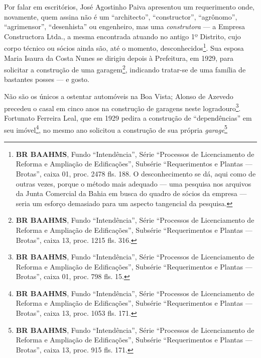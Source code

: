Por falar em escritórios, José Agostinho Paiva apresentou um requerimento onde, novamente, quem assina não é um ``architecto'', ``constructor'', ``agrônomo'', ``agrimensor'', ``desenhista'' ou engenheiro, mas uma \textit{construtora} --- a Empresa Constructora Ltda., a mesma encontrada atuando no antigo 1º Distrito, cujo corpo técnico ou sócios ainda são, até o momento, desconhecidos\footnote{\textbf{BR BAAHMS}, Fundo ``Intendência'', Série ``Processos de Licenciamento de Reforma e Ampliação de Edificações'', Subsérie ``Requerimentos e Plantas --- Brotas'', caixa 01, proc. 2478 fls. 188. O desconhecimento se dá, aqui como de outras vezes, porque o método mais adequado --- uma pesquisa nos arquivos da Junta Comercial da Bahia em busca do quadro de sócios da empresa --- seria um esforço demasiado para um aspecto tangencial da pesquisa.}. Sua esposa Maria Isaura da Costa Nunes se dirigiu depois à Prefeitura, em 1929, para solicitar a construção de uma garagem\footnote{\textbf{BR BAAHMS}, Fundo ``Intendência'', Série ``Processos de Licenciamento de Reforma e Ampliação de Edificações'', Subsérie ``Requerimentos e Plantas --- Brotas'', caixa 13, proc. 1215 fls. 316.}, indicando tratar-se de uma família de bastantes posses --- e gosto.

Não são os únicos a ostentar automóveis na Boa Vista; Alonso de Azevedo precedeu o casal em cinco anos na construção de garagens neste logradouro\footnote{\textbf{BR BAAHMS}, Fundo ``Intendência'', Série ``Processos de Licenciamento de Reforma e Ampliação de Edificações'', Subsérie ``Requerimentos e Plantas --- Brotas'', caixa 01, proc. 798 fls. 15.}. Fortunato Ferreira Leal, que em 1929 pedira a construção de ``dependências'' em seu imóvel\footnote{\textbf{BR BAAHMS}, Fundo ``Intendência'', Série ``Processos de Licenciamento de Reforma e Ampliação de Edificações'', Subsérie ``Requerimentos e Plantas --- Brotas'', caixa 13, proc. 1053 fls. 171.}, no mesmo ano solicitou a construção de sua própria \textit{garage}\footnote{\textbf{BR BAAHMS}, Fundo ``Intendência'', Série ``Processos de Licenciamento de Reforma e Ampliação de Edificações'', Subsérie ``Requerimentos e Plantas --- Brotas'', caixa 13, proc. 915 fls. 171.}


